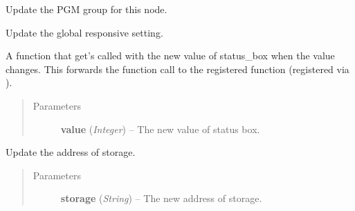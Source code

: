 \documentclass[letterpaper,10pt,english]{sphinxmanual}
\begin{document}

\begin{fulllineitems}
\label{diwavars:diwavars.update_pgm_group}
Update the PGM group for this node.

\end{fulllineitems}


\begin{fulllineitems}
\label{diwavars:diwavars.update_responsive}
Update the global responsive setting.

\end{fulllineitems}


\begin{fulllineitems}
\label{diwavars:diwavars.update_status_box}
A function that get's called with the new value of status\_box when
the value changes. This forwards the function call to the registered
function (registered via {\hyperref[diwavars:diwavars.register_status_box_callback]{}}).
\begin{quote}\begin{description}
\item[{Parameters}] \leavevmode
\textbf{value} (\emph{Integer}) -- The new value of status box.

\end{description}\end{quote}

\end{fulllineitems}


\begin{fulllineitems}
\label{diwavars:diwavars.update_storage}
Update the address of storage.
\begin{quote}\begin{description}
\item[{Parameters}] \leavevmode
\textbf{storage} (\emph{String}) -- The new address of storage.

\end{description}\end{quote}

\end{fulllineitems}
\end{document}
